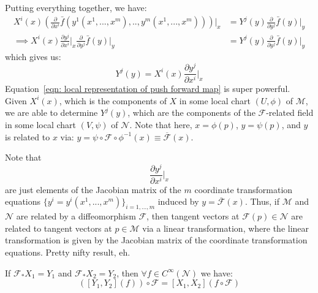 \begin{corollary}
        Putting everything together, we have:
        \begin{align*}
          X^i(x) \left(\frac{\partial}{\partial x^i}
          \bar{f}(y^1(x^1,...,x^m),..,y^m(x^1,...,x^m))\right)\biggr|_x
          &= Y^j(y)\frac{\partial}{\partial y^j} \bar{f}(y)\biggr|_y \\
          \implies X^i(x) \frac{\partial y^j}{\partial x^i}\biggr|_x
          \frac{\partial}{\partial y^j} \bar{f}(y)\biggr|_y &=
          Y^j(y)\frac{\partial}{\partial y^j} \bar{f}(y)\biggr|_y
        \end{align*}
        which gives us:
        \begin{equation}
          \label{eqn: local representation of push forward map}
          Y^j(y) = X^i(x) \frac{\partial y^j}{\partial x^i}\biggr|_x
        \end{equation}
        Equation~\ref{eqn: local representation of push forward map} is
        super powerful. Given $X^i(x)$, which is the components of $X$
        in some local chart $(U,\phi)$ of $\mathcal{M}$, we are able to
        determine $Y^j(y)$, which are the components of the
        $\mathcal{F}$-related field in some local chart $(V,\psi)$ of
        $\mathcal{N}$. Note that here, $x = \phi(p)$, $y = \psi(p)$,
        and $y$ is related to $x$ via: $y = \psi \circ \mathcal{F}
        \circ \phi^{-1}(x) \equiv \overline{\mathcal{F}}(x)$.

        Note that \[\frac{\partial y^j}{\partial x^i}\biggr|_x\] are
        just elements of the Jacobian matrix of the $m$ coordinate
        transformation equations $\{y^i = y^i(x^1,...,x^m)\}_{i =
        1,...,m}$ induced by $y = \overline{\mathcal{F}}(x)$. Thus, if
        $\mathcal{M}$ and $\mathcal{N}$ are related by a diffeomorphism
        $\mathcal{F}$, then tangent vectors at $\mathcal{F}(p)\in
        \mathcal{N}$ are related to tangent vectors at $p\in
        \mathcal{M}$ via a linear transformation, where the linear
        transformation is given by the Jacobian matrix of the
        coordinate transformation equations. Pretty nifty result, eh.
      \end{corollary}
      \begin{theorem}
        \label{theorem: f related field other theorem}
        If $\mathcal{F}_{*}X_1 = Y_1$ and $\mathcal{F}_{*}X_2 = Y_2$,
        then $\forall f\in C^\infty(\mathcal{N})$ we have:
        \[\left([Y_1,Y_2](f)\right) \circ \mathcal{F} = [X_1, X_2](f
        \circ \mathcal{F})\]
      \end{theorem}
